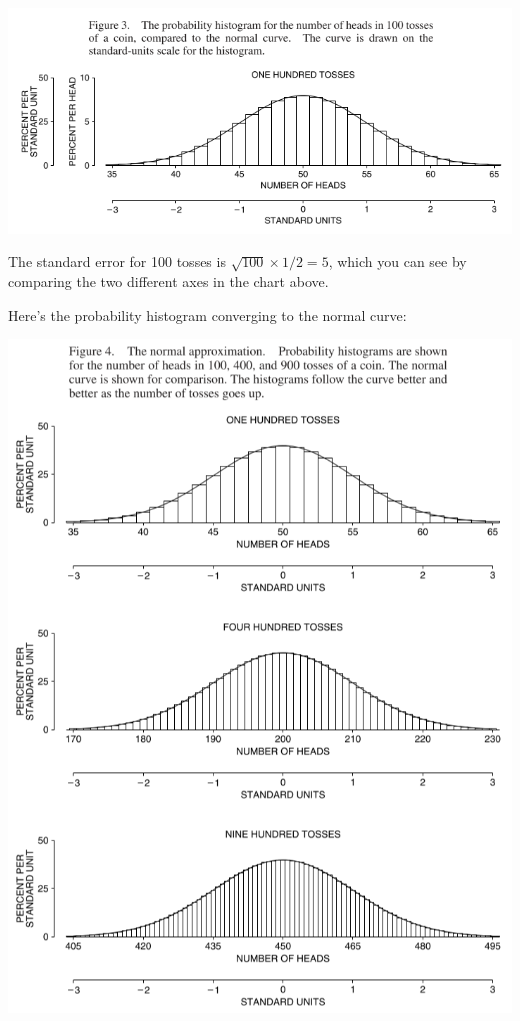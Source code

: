 \documentclass[
]{book}
\begin{document}
\includegraphics{images/Ch18Img03.png}

The standard error for 100 tosses is \(\sqrt{100} \times 1/2 = 5\), which you can see by comparing the two different axes in the chart above.

Here's the probability histogram converging to the normal curve:

\includegraphics{images/Ch18Img04.png}
\end{document}
